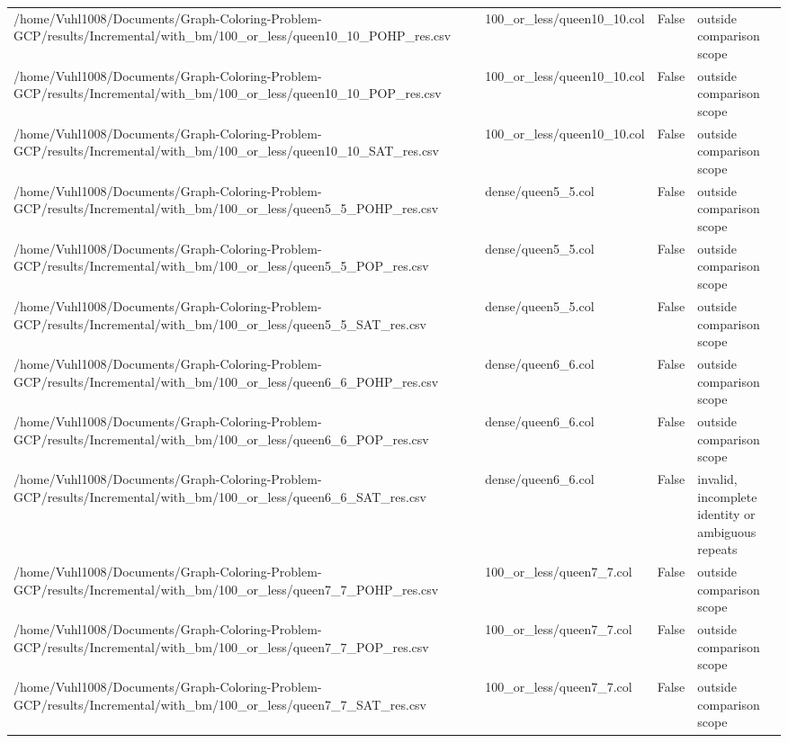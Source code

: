 \begin{table}[htbp]
\begin{tabular}{llll}
/home/Vuhl1008/Documents/Graph-Coloring-Problem-GCP/results/Incremental/with\_bm/100\_or\_less/queen10\_10\_POHP\_res.csv & 100\_or\_less/queen10\_10.col & False & outside comparison scope \\
/home/Vuhl1008/Documents/Graph-Coloring-Problem-GCP/results/Incremental/with\_bm/100\_or\_less/queen10\_10\_POP\_res.csv & 100\_or\_less/queen10\_10.col & False & outside comparison scope \\
/home/Vuhl1008/Documents/Graph-Coloring-Problem-GCP/results/Incremental/with\_bm/100\_or\_less/queen10\_10\_SAT\_res.csv & 100\_or\_less/queen10\_10.col & False & outside comparison scope \\
/home/Vuhl1008/Documents/Graph-Coloring-Problem-GCP/results/Incremental/with\_bm/100\_or\_less/queen5\_5\_POHP\_res.csv & dense/queen5\_5.col & False & outside comparison scope \\
/home/Vuhl1008/Documents/Graph-Coloring-Problem-GCP/results/Incremental/with\_bm/100\_or\_less/queen5\_5\_POP\_res.csv & dense/queen5\_5.col & False & outside comparison scope \\
/home/Vuhl1008/Documents/Graph-Coloring-Problem-GCP/results/Incremental/with\_bm/100\_or\_less/queen5\_5\_SAT\_res.csv & dense/queen5\_5.col & False & outside comparison scope \\
/home/Vuhl1008/Documents/Graph-Coloring-Problem-GCP/results/Incremental/with\_bm/100\_or\_less/queen6\_6\_POHP\_res.csv & dense/queen6\_6.col & False & outside comparison scope \\
/home/Vuhl1008/Documents/Graph-Coloring-Problem-GCP/results/Incremental/with\_bm/100\_or\_less/queen6\_6\_POP\_res.csv & dense/queen6\_6.col & False & outside comparison scope \\
/home/Vuhl1008/Documents/Graph-Coloring-Problem-GCP/results/Incremental/with\_bm/100\_or\_less/queen6\_6\_SAT\_res.csv & dense/queen6\_6.col & False & invalid, incomplete identity or ambiguous repeats \\
/home/Vuhl1008/Documents/Graph-Coloring-Problem-GCP/results/Incremental/with\_bm/100\_or\_less/queen7\_7\_POHP\_res.csv & 100\_or\_less/queen7\_7.col & False & outside comparison scope \\
/home/Vuhl1008/Documents/Graph-Coloring-Problem-GCP/results/Incremental/with\_bm/100\_or\_less/queen7\_7\_POP\_res.csv & 100\_or\_less/queen7\_7.col & False & outside comparison scope \\
/home/Vuhl1008/Documents/Graph-Coloring-Problem-GCP/results/Incremental/with\_bm/100\_or\_less/queen7\_7\_SAT\_res.csv & 100\_or\_less/queen7\_7.col & False & outside comparison scope \\

\end{tabular}
\end{table}
